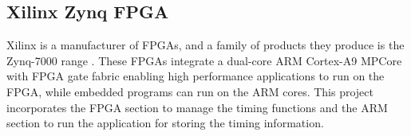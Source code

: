 \subsection{Xilinx Zynq FPGA}

Xilinx is a manufacturer of FPGAs, and a family of products they produce is the Zynq-7000 range \cite{fpga}.
These FPGAs integrate a dual-core ARM Cortex-A9 MPCore with FPGA gate fabric enabling high performance applications to run on the FPGA, while embedded programs can run on the ARM cores.
This project incorporates the FPGA section to manage the timing functions and the ARM section to run the application for storing the timing information.
